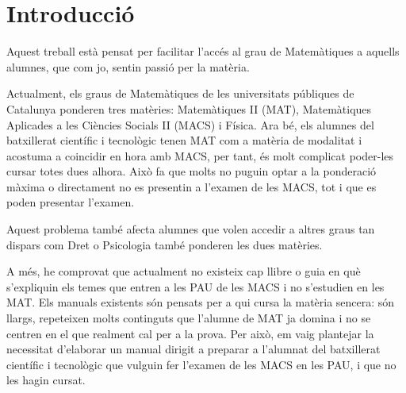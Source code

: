 \chapter{Introducció}

Aquest treball està pensat per facilitar l'accés al grau de Matemàtiques a aquells alumnes, que com jo, sentin passió per la matèria.

Actualment, els graus de Matemàtiques de les universitats públiques de Catalunya ponderen tres matèries: Matemàtiques II (MAT), Matemàtiques Aplicades a les Ciències Socials II (MACS) i Física. Ara bé, els alumnes del batxillerat científic i tecnològic tenen MAT com a matèria de modalitat i acostuma a coincidir en hora amb MACS, per tant, és molt complicat poder-les cursar totes dues alhora. Això fa que molts no puguin optar a la ponderació màxima o directament no es presentin a l'examen de les MACS, tot i que es poden presentar l'examen.

Aquest problema també afecta alumnes que volen accedir a altres graus tan dispars com Dret o Psicologia també ponderen les dues matèries.

A més, he comprovat que actualment no existeix cap llibre o guia en què s'expliquin els temes que entren a les PAU de les MACS i no s'estudien en les MAT. Els manuals existents són pensats per a qui cursa la matèria sencera: són llargs, repeteixen molts continguts que l'alumne de MAT ja domina i no se centren en el que realment cal per a la prova. Per això, em vaig plantejar la necessitat d'elaborar un manual dirigit a preparar a l'alumnat del batxillerat científic i tecnològic que vulguin fer l'examen de les MACS en les PAU, i que no les hagin cursat.

\bigskip

